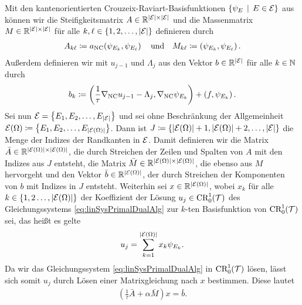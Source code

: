 \begin{remark} 
  \label{rem:primalDualMatrixEquations}
  Mit den kantenorientierten Crouzeix-Raviart-Basisfunktionen
  $\{\psi_E\,\mid\,E\in\mathcal{E}\}$ aus  können
  wir die Steifigkeitsmatrix $A\in\mathbb{R}^{|\mathcal{E}|\times|\mathcal{E}|}$ und die
  Massenmatrix $M\in\mathbb{R}^{|\mathcal{E}|\times|\mathcal{E}|}$ für alle
  $k,\ell\in\{1,2,\ldots,|\mathcal{E}|\}$ definieren durch
  \begin{align*}
    A_{k\ell}\coloneqq a_\textup{NC}\!\left(\psi_{E_k},\psi_{E_\ell}\right)
    \quad\text{und}\quad
    M_{k\ell}\coloneqq \left(\psi_{E_k},\psi_{E_\ell}\right).
  \end{align*}
  Außerdem definieren wir mit $u_{j-1}$ und $\Lambda_j$ aus
   den Vektor $b\in\mathbb{R}^{|\mathcal{E}|}$ für alle
  $k\in\mathbb{N}$ durch
  \begin{align*}
    b_k\coloneqq 
    \left(\frac{1}{\tau}\nabla_\textup{NC} u_{j-1}-\Lambda_j,\nabla_\textup{NC}\psi_{E_k}\right)
    + \left( f,\psi_{E_k} \right).
  \end{align*}
  Sei nun $\mathcal{E}=\left\{E_1,E_2,\ldots,E_{|\mathcal{E}|}\right\}$ und sei ohne
  Beschränkung der Allgemeinheit 
  $\mathcal{E}(\Omega)\coloneqq\left\{E_1,E_2,\ldots,E_{|\mathcal{E}(\Omega)|}\right\}$.  
  Dann ist $J\coloneqq\{|\mathcal{E}(\Omega)|+1,|\mathcal{E}(\Omega)|+2,\ldots,|\mathcal{E}|\}$
  die Menge der Indizes der Randkanten in $\mathcal{E}$.
  Damit definieren wir die Matrix $\bar
  A\in\mathbb{R}^{|\mathcal{E}(\Omega)|\times|\mathcal{E}(\Omega)|}$, die durch Streichen der
  Zeilen und Spalten von $A$ mit den Indizes aus $J$ entsteht, die Matrix $\bar
  M\in\mathbb{R}^{|\mathcal{E}(\Omega)|\times|\mathcal{E}(\Omega)|}$, die ebenso aus $M$
  hervorgeht und den Vektor $\bar b\in\mathbb{R}^{|\mathcal{E}(\Omega)|}$, der durch
  Streichen der Komponenten von $b$ mit Indizes in $J$ entsteht.
  Weiterhin sei $x\in\mathbb{R}^{|\mathcal{E}(\Omega)|}$, wobei $x_k$ für alle
  $k\in\{1,2\ldots,|\mathcal{E}(\Omega)|\}$ der Koeffizient der Lösung 
  $u_j\in\textup{CR}^1_0(\mathcal{T})$ des
  Gleichungssystems \eqref{eq:linSysPrimalDualAlg} zur $k$-ten Basisfunktion
  von $\textup{CR}^1_0(\mathcal{T})$ sei, das heißt es gelte
  \begin{align*}
    u_j=\sum_{k=1}^{|\mathcal{E}(\Omega)|} x_k\psi_{E_k}.
  \end{align*}
  Da wir das Gleichungssystem \eqref{eq:linSysPrimalDualAlg} in
  $\textup{CR}^1_0(\mathcal{T})$ lösen, lässt sich somit $u_j$ durch Lösen einer
  Matrixgleichung nach $x$ bestimmen. 
  Diese lautet
  \begin{align}
    \label{eq:linSysPrimalDualAlgMatrixEq}
    \left(\frac{1}{\tau}\bar A+\alpha \bar M\right)x=\bar b.
  \end{align}
\end{remark}


